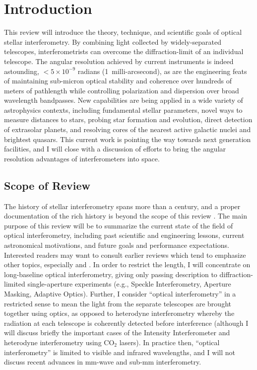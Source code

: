 \documentclass[12pt]{iopart}
\begin{document}
\section{Introduction}
This review will introduce the theory, technique, and scientific goals
of optical stellar interferometry.  By combining
light collected by widely-separated telescopes, interferometrists can
overcome the diffraction-limit of an individual telescope.  The
angular resolution achieved by current instruments is indeed
astounding, $<5 \times 10^{-9}$ radians (1~milli-arcsecond), as are
the engineering feats of maintaining sub-micron 
optical stability and coherence over hundreds of meters of
pathlength while controlling polarization and dispersion over
broad wavelength bandpasses.
New capabilities are being applied in a wide
variety of astrophysics contexts, including fundamental stellar
parameters, novel ways to measure distances to stars, probing star
formation and evolution, direct detection of extrasolar planets, and
resolving cores of the nearest active galactic nuclei and brightest
quasars.  This current work is pointing the way towards next generation
facilities, and I will close with a discussion of efforts to bring the
angular resolution advantages of interferometers into space.

\subsection{Scope of Review}
The history of stellar interferometry spans more than a century, and a
proper documentation of the rich history is beyond the scope of this
review \citep[see][for a historical overview of the
field]{lawson2000}.  The main purpose of this review will be to
summarize the current state of the field of optical interferometry,
including past scientific and engineering lessons, current
astronomical motivations, and future goals and performance
expectations.  Interested readers may want to consult earlier
reviews which tend to emphasize other topics, especially \citet{sc1992} and \citet{quirrenbach2001}.
In order to restrict the length, I will concentrate on
long-baseline optical interferometry, giving only passing description
to diffraction-limited single-aperture experiments (e.g., Speckle
Interferometry, Aperture Masking, Adaptive Optics).  Further, I
consider ``optical interferometry'' in a restricted sense to mean the
light from the separate telescopes are brought together using optics,
as opposed to heterodyne interferometry whereby the radiation at each
telescope is coherently detected before interference (although I will
discuss briefly the important cases of the Intensity Interferometer
and heterodyne interferometry using CO$_2$ lasers).  In practice then,
``optical interferometry'' is limited to visible and infrared
wavelengths, and I will not discuss recent advances in mm-wave and
sub-mm interferometry.
\end{document}
